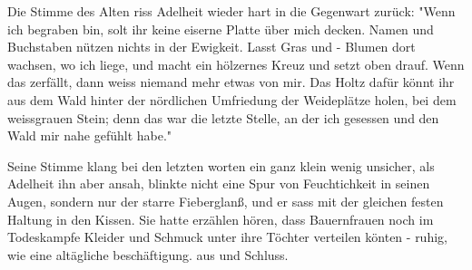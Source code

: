 \def\day{26.8.42}
\mktitle

Die Stimme des Alten riss Adelheit wieder hart in die Gegenwart zur\"{u}ck:
"Wenn ich begraben bin, solt ihr keine eiserne Platte \"{u}ber mich decken.
Namen und Buchstaben n\"{u}tzen nichts in der Ewigkeit.
Lasst Gras und - Blumen dort wachsen, wo ich liege, und macht ein h\"{o}lzernes Kreuz und setzt oben drauf.
Wenn das zerf\"{a}llt, dann weiss niemand mehr etwas von mir.
Das Holtz daf\"{u}r k\"{o}nnt ihr aus dem Wald hinter der n\"{o}rdlichen Umfriedung der Weidepl\"{a}tze holen, bei dem weissgrauen Stein; denn das war die letzte Stelle, an der ich gesessen und den Wald mir nahe gef\"{u}hlt habe."

Seine Stimme klang bei den letzten worten ein ganz klein wenig unsicher, als Adelheit ihn aber ansah, blinkte nicht eine Spur von Feuchtichkeit in seinen Augen, sondern nur der starre Fieberglan{\ss}, und er sass mit der gleichen festen Haltung in den Kissen.
Sie hatte erz\"{a}hlen h\"{o}ren, dass Bauernfrauen noch im Todeskampfe Kleider und Schmuck unter ihre T\"{o}chter verteilen k\"{o}nten - ruhig, wie eine alt\"{a}gliche besch\"{a}ftigung.
aus und Schluss.

\clearpage
